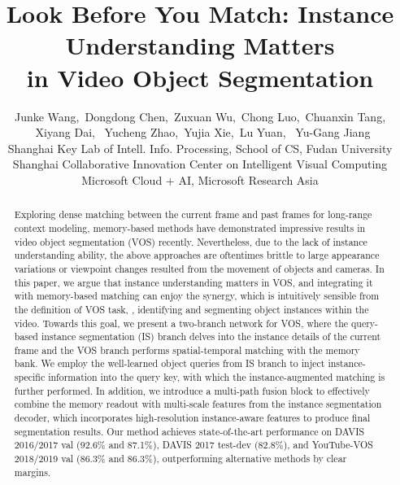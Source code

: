 \documentclass[10pt,twocolumn,letterpaper]{article}
\begin{document}
\title{Look Before You Match: Instance Understanding Matters \\ in Video Object Segmentation}

\author{Junke Wang,~Dongdong Chen,~Zuxuan Wu,~Chong Luo,~Chuanxin Tang, \\ ~Xiyang Dai, ~Yucheng Zhao,~Yujia Xie,~Lu Yuan, ~Yu-Gang Jiang
\\
Shanghai Key Lab of Intell. Info. Processing, School of CS, Fudan University \\
Shanghai Collaborative Innovation Center on Intelligent Visual Computing \\
Microsoft Cloud + AI, Microsoft Research Asia 
}

\maketitle


\begin{abstract}
Exploring dense matching between the current frame and past frames for long-range context modeling, memory-based methods have demonstrated impressive results in video object segmentation (VOS) recently. Nevertheless, due to the lack of instance understanding ability, the above approaches are oftentimes brittle to large appearance variations or viewpoint changes resulted from the movement of objects and cameras. In this paper, we argue that instance understanding matters in VOS, and integrating it with memory-based matching can enjoy the synergy, which is intuitively sensible from the definition of VOS task, \ie, identifying and segmenting object instances within the video. Towards this goal, we present a two-branch network for VOS, where the query-based instance segmentation (IS) branch delves into the instance details of the current frame and the VOS branch performs spatial-temporal matching with the memory bank. We employ the well-learned object queries from IS branch to inject instance-specific information into the query key, with which the instance-augmented matching is further performed. In addition, we introduce a multi-path fusion block to effectively combine the memory readout with multi-scale features from the instance segmentation decoder, which incorporates high-resolution instance-aware features to produce final segmentation results. Our method achieves state-of-the-art performance on DAVIS 2016/2017 val (92.6\% and 87.1\%), DAVIS 2017 test-dev (82.8\%), and YouTube-VOS 2018/2019 val (86.3\% and
86.3\%), outperforming alternative methods by clear margins. 
\end{abstract}
\end{document}
